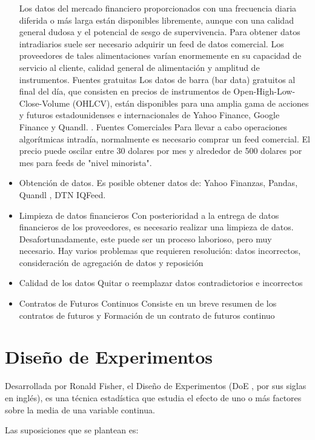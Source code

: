 \documentclass{article}
\begin{document}
\begin{itemize}
Los datos del mercado financiero proporcionados con una frecuencia diaria diferida o más larga están disponibles libremente, aunque con una calidad general dudosa y el potencial de sesgo de supervivencia. Para obtener datos intradiarios suele ser necesario adquirir un feed de datos comercial. Los proveedores de tales alimentaciones varían enormemente en su capacidad de servicio al cliente, calidad general de alimentación y amplitud de instrumentos.
\subitem Fuentes gratuitas
Los datos de barra (bar data) gratuitos al final del día, que consisten en precios de instrumentos de Open-High-Low-Close-Volume (OHLCV), están disponibles para una amplia gama de acciones y futuros estadounidenses e internacionales de Yahoo Finance, Google Finance y Quandl. .
\subitem Fuentes Comerciales
Para llevar a cabo operaciones algorítmicas intradía, normalmente es necesario comprar un feed comercial. El precio puede oscilar entre  30 dolares por mes y alrededor de  500 dolares por mes para feeds de "nivel minorista".  

\item  Obtención de datos. 
Es posible obtener datos de: Yahoo Finanzas, Pandas, Quandl , DTN IQFeed.

\item  Limpieza de datos financieros
Con posterioridad a la entrega de datos financieros de los proveedores, es necesario realizar una limpieza de datos. Desafortunadamente, este puede ser un proceso laborioso, pero muy necesario. Hay varios problemas que requieren resolución: datos incorrectos, consideración de agregación de datos y reposición
\item Calidad de los datos
Quitar o reemplazar datos contradictorios e incorrectos
\item Contratos de Futuros Continuos
Consiste en un breve resumen de los contratos de futuros y Formación de un contrato de futuros continuo \cite{halls-moore}

\end{itemize}
\newpage

\section{Diseño de Experimentos}

Desarrollada por Ronald Fisher, el Diseño de Experimentos (DoE , por sus siglas en inglés), es una técnica estadística que estudia el efecto de uno o más factores sobre la media de una variable continua.

Las suposiciones que se plantean es:
\end{document}
